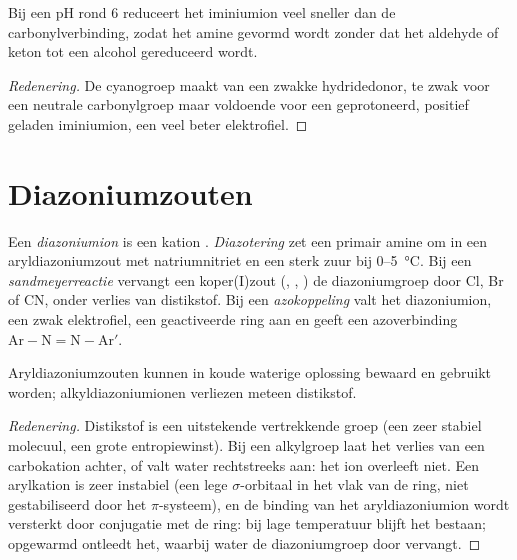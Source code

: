\begin{proposition}\label{prop:b2:amines:reductive-amination}
Bij een pH rond 6 reduceert  het iminiumion veel sneller dan de carbonylverbinding, zodat
het amine gevormd wordt zonder dat het aldehyde of keton tot een alcohol gereduceerd wordt.
\end{proposition}

\begin{proof}[Redenering]
De cyanogroep maakt van  een zwakke hydridedonor, te zwak voor een neutrale carbonylgroep maar
voldoende voor een geprotoneerd, positief geladen iminiumion, een veel beter elektrofiel.
\end{proof}

\section{Diazoniumzouten}

\begin{definition}[Diazoniumchemie]\label{def:b2:amines:diazonium}
Een \emph{diazoniumion} is een kation . \emph{Diazotering}
zet een primair  amine om in een aryldiazoniumzout met natriumnitriet en een sterk zuur bij
0--\qty{5}{\degreeCelsius}. Bij een \emph{sandmeyerreactie} vervangt een koper(I)zout
(, , ) de diazoniumgroep door Cl, Br of CN, onder verlies van
distikstof. Bij een \emph{azokoppeling} valt het diazoniumion, een zwak elektrofiel,
een geactiveerde  ring aan en geeft een azoverbinding $\mathrm{Ar{-}N{=}N{-}Ar'}$.
\end{definition}

\begin{proposition}\label{prop:b2:amines:diazonium}
Aryldiazoniumzouten kunnen in koude waterige oplossing bewaard en gebruikt worden; alkyldiazoniumionen verliezen
meteen distikstof.
\end{proposition}

\begin{proof}[Redenering]
Distikstof is een uitstekende vertrekkende groep (een zeer stabiel molecuul, een grote entropiewinst). Bij een
alkylgroep laat het verlies van  een carbokation achter, of valt water rechtstreeks aan: het ion
overleeft niet. Een arylkation is zeer instabiel (een lege $\sigma$-orbitaal in het vlak van de ring,
niet gestabiliseerd door het $\pi$-systeem), en de binding  van het aryldiazoniumion wordt
versterkt door conjugatie met de ring: bij lage temperatuur blijft het bestaan; opgewarmd ontleedt het,
waarbij water de diazoniumgroep door  vervangt.
\end{proof}

